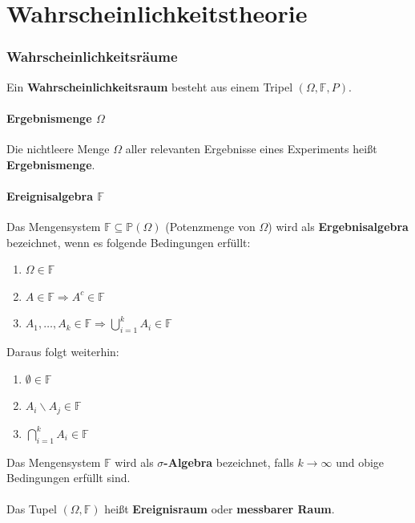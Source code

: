 \documentclass[a4paper,twocolumn,10pt]{article}
\newenvironment{iii}{\begin{enumerate}[label={\roman{*})}]}{\end{enumerate}}
\begin{document}
{\small \tableofcontents}
\newpage

\part{Wahrscheinlichkeitstheorie}

\section{Wahrscheinlichkeitsräume}
Ein \textbf{Wahrscheinlichkeitsraum} besteht aus einem Tripel $(\Omega ,\mathbb{F} ,P)$.

\subsection{Ergebnismenge $\Omega$}
Die nichtleere Menge $\Omega$ aller relevanten Ergebnisse eines Experiments heißt \textbf{Ergebnismenge}.

\subsection{Ereignisalgebra $\mathbb F$}
Das Mengensystem $\mathbb F \subseteq \mathbb P(\Omega)$ (Potenzmenge von $\Omega$) wird als \textbf{Ergebnisalgebra} bezeichnet, wenn es folgende Bedingungen erfüllt:
\begin{iii}
\item $\Omega \in \mathbb F$
\item $A \in \mathbb F \Rightarrow A^c \in \mathbb F$
\item $A_1,\dots,A_k \in \mathbb F \Rightarrow \bigcup_{i=1}^k A_i \in \mathbb F$
\end{iii}
Daraus folgt weiterhin:
\begin{iii}
\item $\emptyset \in \mathbb F$
\item $A_i \backslash A_j \in \mathbb F$
\item $\bigcap_{i=1}^k A_i \in \mathbb F$
\end{iii}
Das Mengensystem $\mathbb F$  wird als \textbf{$\sigma$-Algebra} bezeichnet, falls $k\rightarrow\infty$ und obige Bedingungen erfüllt sind.\\\\
Das Tupel $(\Omega, \mathbb F)$ heißt \textbf{Ereignisraum} oder \textbf{messbarer Raum}.
\end{document}
